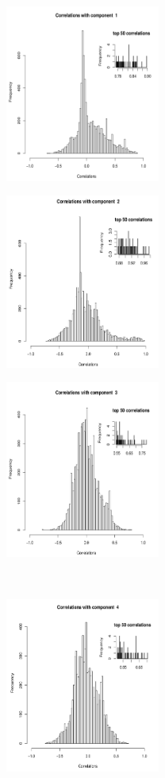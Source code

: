 \begin{figure}[!ht]
\centering
 \begin{subfigure}[t]{2in}
    \includegraphics[width=2in]{NMF/figures/figS7a}
 \end{subfigure}
 \begin{subfigure}[t]{2in}
    \includegraphics[width=2in]{NMF/figures/figS7b}
 \end{subfigure}
 \begin{subfigure}[t]{2in}
    \includegraphics[width=2in]{NMF/figures/figS7c}
 \end{subfigure}\\
 \begin{subfigure}[t]{2in}
    \includegraphics[width=2in]{NMF/figures/figS7d}

\end{subfigure}
\end{figure}
